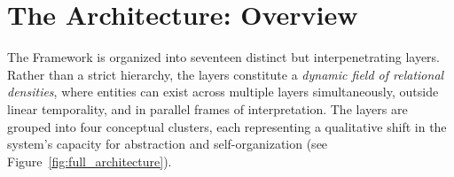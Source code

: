 \section{The \Apeiron{} Architecture: Overview}
\label{sec:architecture_overview}

The \Apeiron{} Framework is organized into seventeen distinct but interpenetrating layers. Rather than a strict hierarchy, the layers constitute a \emph{dynamic field of relational densities}, where entities can exist across multiple layers simultaneously, outside linear temporality, and in parallel frames of interpretation. The layers are grouped into four conceptual clusters, each representing a qualitative shift in the system's capacity for abstraction and self-organization (see Figure~\ref{fig:full_architecture}).

